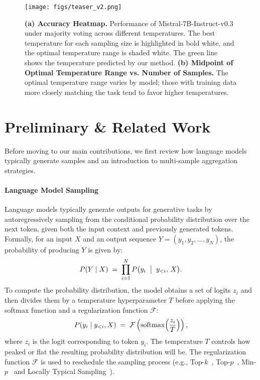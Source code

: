 \begin{figure*}[t]
\texttt{[image: figs/teaser\_v2.png]}
\vspace{-6mm}
\caption{ \textbf{(a) Accuracy Heatmap.} Performance of Mistral-7B-Instruct-v0.3 under majority voting across different temperatures. The best temperature for each sampling size is highlighted in bold white, and the optimal temperature range is shaded white. The green line shows the temperature predicted by our method. \textbf{(b) Midpoint of Optimal Temperature Range vs. Number of Samples.} The optimal temperature range varies by model; those with training data more closely matching the task tend to favor higher temperatures.}
\label{fig: teaser}
\end{figure*}
\section{Preliminary \& Related Work}
Before moving to our main contributions, we first review how language models typically generate samples and an introduction to multi-sample aggregation strategies.
\paragraph{Language Model Sampling} Language models typically generate outputs for generative tasks by autoregressively sampling from the conditional probability distribution over the next token, given both the input context and previously generated tokens. Formally, for an input \(X\) and an output sequence \(Y = (y_1, y_2, \dots, y_N)\), the probability of producing \(Y\) is given by:
\begin{align}
P(Y \mid X) \;=\; \prod_{i=1}^{N} P\bigl(y_i \;\bigm|\; y_{<i},\, X\bigr).
\label{Formula 1}
\end{align}
To compute the probability distribution, the model obtains a set of logits $z_i$ and then divides them by a temperature hyperparameter \(T\) before applying the softmax function and a regularization function $\mathcal{F}$:
\begin{align}
P(y_i \mid y_{<i}, X) \;=\; \mathcal{F}\left(\operatorname{softmax}\Bigl(\frac{z_i}{T}\Bigr)\right),
\end{align}
where \(z_i\) is the logit corresponding to token \(y_i\). The temperature \(T\) controls how peaked or flat the resulting probability distribution will be. The regularization function $\mathcal{F}$ is used to reschedule the sampling process (e.g., Top-$k$~\cite{kool2019stochastic}, Top-$p$~\cite{holtzman2019curious}, Min-$p$~\cite{nguyen2024turning} and Locally Typical Sampling~\cite{meister2023locally}).

